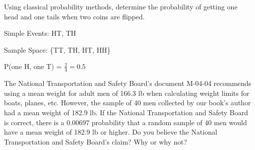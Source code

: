 \documentclass[addpoints]{exam}
\begin{document}
\begin{questions}



\question Using classical probability methods, determine the probability of getting one head and one tails when two coins are flipped.
\begin{solution}[\stretch{1}]
Simple Events: HT, TH

Sample Space: \{TT, TH, HT, HH\}

P(one H, one T) = $\frac{2}{4}=0.5$
\end{solution}

\question The National Transportation and Safety Board's document M-04-04 recommends using a mean weight for adult men of 166.3 lb when calculating weight limits for boats, planes, etc. However, the sample of 40 men collected by our book's author had a mean weight of 182.9 lb. If the National Transportation and Safety Board is correct, there is a $0.00697$ probability that a random sample of 40 men would have a mean weight of 182.9 lb or higher. Do you believe the National Transportation and Safety Board's claim? Why or why not?







\end{questions}
\end{document}
